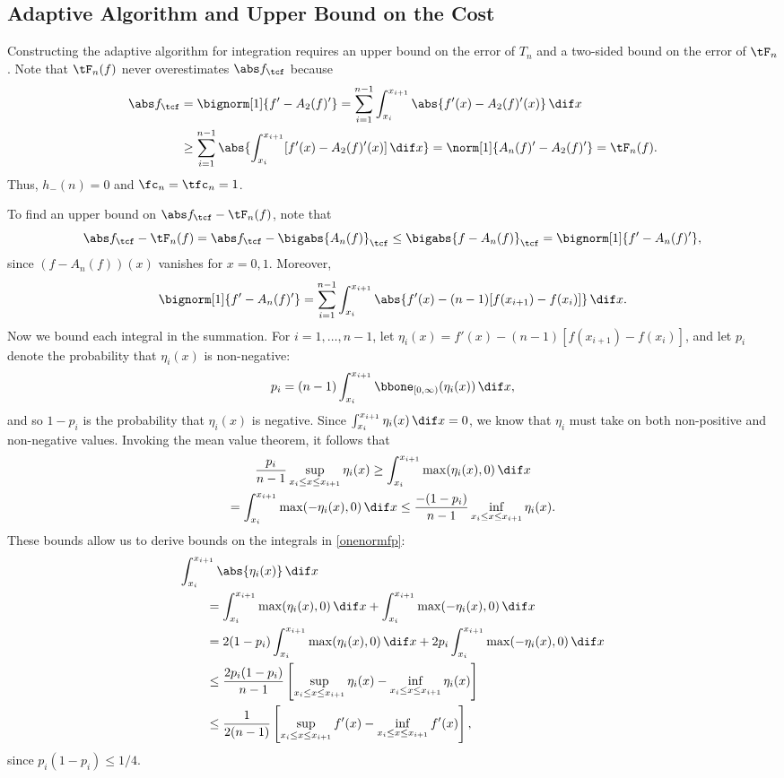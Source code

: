 \subsection{Adaptive Algorithm and Upper Bound on the Cost}

Constructing the adaptive algorithm for integration requires an upper bound on the error of $T_n$ and a two-sided bound on the error of $\tF_n$.  Note that $\tF_{n}(f)$ never overestimates $\Ftnorm{f}$ because 
\begin{align*}
\Ftnorm{f} & = \bignorm[1]{f'-A_2(f)'} 
= \sum_{i=1}^{n-1} \int_{x_i}^{x_{i+1}} \abs{f'(x) - A_2(f)'(x)} \, \dif x \\
& \ge \sum_{i=1}^{n-1} \abs{\int_{x_i}^{x_{i+1}} [f'(x) - A_2(f)'(x)] \, \dif x}=\norm[1]{A_n(f)'-A_2(f)'} = \tF_n(f).
\end{align*}
Thus, $h_{-}(n)=0$ and $\fc_n=\tfc_n=1$. 

To find an upper bound on $\Ftnorm{f}-\tF_{n}(f)$, note that 
\begin{equation*}
\Ftnorm{f} - \tF_{n}(f) = \Ftnorm{f} - \bigabs{A_n(f)}_{\tcf} \le \bigabs{f-A_n(f)}_{\tcf} = \bignorm[1]{f' -A_n(f)'},
\end{equation*}
since $(f-A_n(f))(x)$ vanishes for $x=0,1$.  Moreover, 
\begin{equation} \label{onenormfp}
\bignorm[1]{f' -A_n(f)'} = \sum_{i=1}^{n-1} \int_{x_i}^{x_{i+1}} \abs{f'(x) -(n-1)[f(x_{i+1})-f(x_i)]} \, \dif x.
\end{equation}
Now we bound each integral in the summation.  For $i=1, \ldots, n-1$, let $\eta_i(x) = f'(x) -(n-1)[f(x_{i+1})-f(x_i)]$, and let $p_i$ denote the probability that $\eta_i(x)$ is non-negative:
\[
p_i = (n-1)\int_{x_i}^{x_{i+1}} \bbone_{[0,\infty)} (\eta_i(x)) \, \dif x,
\]
and so $1-p_i$ is the probability that $\eta_i(x)$ is negative.  Since $\int_{x_i}^{x_{i+1}} \eta_i(x) \, \dif x =0$, we know that $\eta_i$ must take on both non-positive and non-negative values.  Invoking the mean value theorem, it follows that 
\begin{multline*}
\frac{p_i}{n-1} \sup_{x_i \le x \le x_{i+1}} \eta_i(x) \ge \int_{x_i}^{x_{i+1}} \max(\eta_i(x),0) \, \dif x \\
= \int_{x_i}^{x_{i+1}} \max(-\eta_i(x),0) \, \dif x \le \frac{-(1-p_i)}{n-1} \inf_{x_i \le x \le x_{i+1}} \eta_i(x) .
\end{multline*}
These bounds allow us to derive bounds on the integrals in \eqref{onenormfp}:
\begin{align*}
\MoveEqLeft{\int_{x_i}^{x_{i+1}} \abs{\eta_i(x)} \, \dif x} \\
 &= \int_{x_i}^{x_{i+1}} \max(\eta_i(x),0) \, \dif x + \int_{x_i}^{x_{i+1}} \max(-\eta_i(x),0) \, \dif x\\
&=2(1-p_i) \int_{x_i}^{x_{i+1}} \max(\eta_i(x),0) \, \dif x + 2p_i\int_{x_i}^{x_{i+1}} \max(-\eta_i(x),0) \, \dif x\\
&\le \frac{2p_i(1-p_i)}{n-1} \left[ \sup_{x_i \le x \le x_{i+1}} \eta_i(x) - \inf_{x_i \le x \le x_{i+1}} \eta_i(x) \right]\\
&\le\frac{1}{2(n-1)} \left[ \sup_{x_i \le x \le x_{i+1}} f'(x) - \inf_{x_i \le x \le x_{i+1}} f'(x) \right],
\end{align*}
since $p_i(1-p_i)\le 1/4$.  

